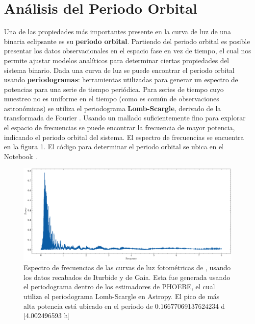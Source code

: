 \section{Análisis del Periodo Orbital} \label{metodologia:analisisperiodo}

Una de las propiedades más importantes presente en la curva de luz de una
binaria eclipsante es su \textbf{periodo orbital}. Partiendo del periodo orbital
es posible presentar los datos observacionales en el espacio fase en vez de
tiempo, el cual nos permite ajustar modelos analíticos para determinar ciertas
propiedades del sistema binario. Dada una curva de luz se puede encontrar el
periodo orbital usando \textbf{periodogramas}: herramientas utilizadas para
generar un espectro de potencias para una serie de tiempo periódica. Para series
de tiempo cuyo muestreo no es uniforme en el tiempo (como es común de
observaciones astronómicas) se utiliza el periodograma \textbf{Lomb-Scargle},
derivado de la transformada de Fourier .
Usando un mallado suficientemente fino para explorar el espacio de frecuencias
se puede encontrar la frecuencia de mayor potencia, indicando el periodo orbital
del sistema. El espectro de frecuencias se encuentra en la figura
\ref{periodogramaLSFrecs}. El código para determinar el periodo orbital se ubica
en el Notebook
\href{https://github.com/KnightIV/UANL_MAPTA_PlanObservaciones/blob/0b571b7377a76e0360d5e142924cc964194ace8b/analisis/phoebe_model/estimations/periodogram.ipynb}{}.

\begin{figure}[!h]
	\centering
	\includegraphics[scale=0.55]{Metodologia/Secciones/AnalisisPeriodo/Figures/LS Power Spectrum.png}
	
	\caption{Espectro de frecuencias de las curvas de luz fotométricas de
	\atoObjIdNoSpace, usando los datos recabados de Iturbide y de Gaia. Esta fue
	generada usando el periodograma dentro de los estimadores de PHOEBE, el cual
	utiliza el periodograma Lomb-Scargle en Astropy. El pico de más alta
	potencia está ubicado en el periodo de 0.16677069137624234 d [4.002496593
	h]} 
	\label{periodogramaLSFrecs}
\end{figure}

